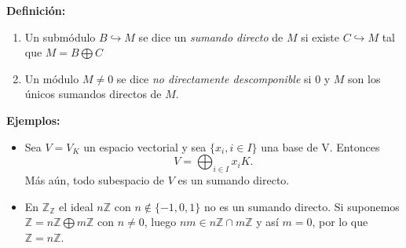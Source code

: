 \documentclass[notes=show]{beamer}%
\begin{document}
\begin{frame}
    \textbf{Definición:}
        \begin{enumerate}
            \item Un submódulo \(B \hookrightarrow M \) se dice un \textit{sumando directo} de \(M\) si existe \(C\hookrightarrow M\)
            tal que \(M = B\bigoplus C\)
            \item Un módulo \(M \neq 0\) se dice \textit{no directamente descomponible} si \(0\) y \(M\) son los únicos sumandos directos
            de \(M\).
        \end{enumerate}
    \textbf{Ejemplos:}
        \begin{itemize}
            \item Sea \(V=V_K\) un espacio vectorial y sea \(\{x_i, i\in I\}\) una base de V. Entonces
            \[ V = \bigoplus_{i\in I} x_i K .\]
            Más aún, todo subespacio de \(V\) es un sumando directo.
            \item En \(\mathbb{Z}_{\mathbb{Z}}\) el ideal \(n\mathbb{Z}\) con \(n \notin \{-1,0,1\}\) no es un sumando directo.
            Si suponemos \(\mathbb{Z} = n\mathbb{Z} \bigoplus m\mathbb{Z}\) con \(n\neq 0\), luego \(nm \in n\mathbb{Z}\cap m\mathbb{Z}\)
            y así \(m=0\), por lo que \(\mathbb{Z} = n\mathbb{Z}\).
        \end{itemize}
\end{frame}
\end{document}
